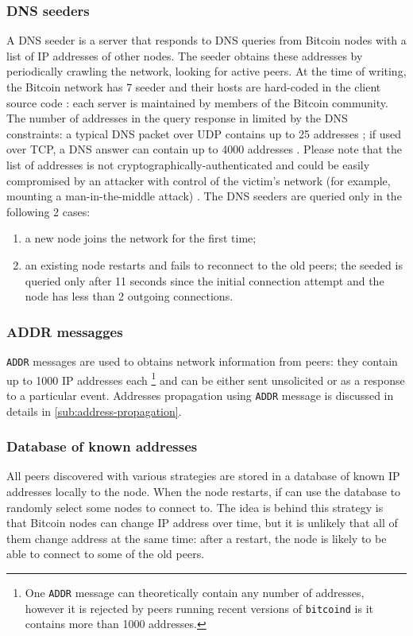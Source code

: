 \subsubsection{DNS seeders}
A DNS seeder is a server that responds to \ac{DNS} queries from Bitcoin nodes with a list of IP addresses of other nodes.
The seeder obtains these addresses by periodically crawling the network, looking for active peers.
At the time of writing, the Bitcoin network has \num{7} seeder and their hosts are hard-coded in the client source code \cite{bitcoin_dns}:
each server is maintained by members of the Bitcoin community.
The number of addresses in the query response in limited by the \ac{DNS} constraints:
a typical \ac{DNS} packet over UDP contains up to \num{25} addresses \cite{dns_stackoverflow};
if used over TCP, a \ac{DNS} answer can contain up to \num{4000} addresses \cite{dns_4000}.
Please note that the list of addresses is not cryptographically-authenticated and could be easily compromised by an attacker with control of the victim's network (for example, mounting a man-in-the-middle attack) \cite{bitcoin_guide}.
The DNS seeders are queried only in the following \num{2} cases:
\begin{enumerate}
	\item a new node joins the network for the first time;
	\item an existing node restarts and fails to reconnect to the old peers; the seeded is queried only after \num{11} seconds since the initial connection attempt and the node has less than \num{2} outgoing connections.
\end{enumerate}

\subsubsection{ADDR messagges}
\texttt{ADDR} messages are used to obtains network information from peers:
they contain up to \num{1000} IP addresses each \footnote{One \texttt{ADDR} message can theoretically contain any number of addresses, however it is rejected by peers running recent versions of \texttt{bitcoind} is it contains more than \num{1000} addresses.} and can be either sent unsolicited or as a response to a particular event.
Addresses propagation using \texttt{ADDR} message is discussed in details in \cref{sub:address-propagation}.

\subsubsection{Database of known addresses}
All peers discovered with various strategies are stored in a database of known IP addresses locally to the node.
When the node restarts, if can use the database to randomly select some nodes to connect to.
The idea is behind this strategy is that Bitcoin nodes can change IP address over time, but it is unlikely that all of them change address at the same time:
after a restart, the node is likely to be able to connect to some of the old peers.

